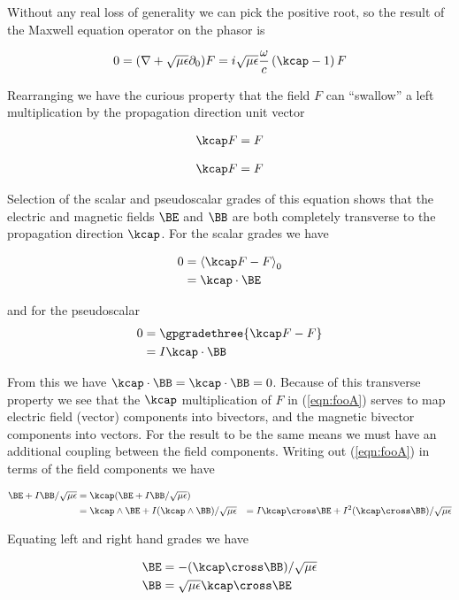 Without any real loss of generality we can pick the positive root, so the result of the Maxwell equation operator on the phasor is

\begin{align}\label{eqn:foo5}
0 = (\grad + \sqrt{\mu\epsilon}\partial_0) F = i \sqrt{\mu\epsilon}\frac{\omega}{c} \left( \kcap - 1\right) F 
\end{align}

Rearranging we have the curious property that the field $F$ can ``swallow'' a left multiplication by the propagation direction unit vector 

\begin{align}\label{eqn:foo9}
\kcap F = F 
\end{align}

\begin{align}\label{eqn:fooA}
\kcap F = F 
\end{align}

Selection of the scalar and pseudoscalar grades of this equation shows that the electric and magnetic fields $\BE$ and $\BB$ are both completely transverse to the propagation direction $\kcap$.  For the scalar grades we have

\begin{align*}
0 &= \gpgradezero{\kcap F - F} \\
  &= \kcap \cdot \BE
\end{align*}

and for the pseudoscalar
\begin{align*}
0 &= \gpgradethree{\kcap F - F} \\
  &= I \kcap \cdot \BB
\end{align*}

From this we have $\kcap \cdot \BB = \kcap \cdot \BB = 0$.  Because of this transverse property we see that the $\kcap$ multiplication of $F$ in (\ref{eqn:fooA}) serves to map electric field (vector) components into bivectors, and the magnetic bivector components into vectors.  For the result to be the same means we must have an additional coupling between the field components.  Writing out (\ref{eqn:fooA}) in terms of the field components we have

\begin{align*}
\BE + I\BB/\sqrt{\mu\epsilon} 
&= \kcap (\BE + I\BB/\sqrt{\mu\epsilon} ) \\
&= \kcap \wedge \BE + I (\kcap \wedge \BB)/\sqrt{\mu\epsilon} 
&= I \kcap \cross \BE + I^2 (\kcap \cross \BB)/\sqrt{\mu\epsilon} 
\end{align*}

Equating left and right hand grades we have

\begin{align}\label{eqn:fooD}
\BE &= -(\kcap \cross \BB)/\sqrt{\mu\epsilon} \\
\BB &= \sqrt{\mu\epsilon} \kcap \cross \BE 
\end{align}

\EndArticle
